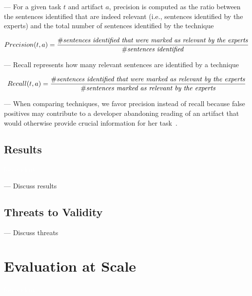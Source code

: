 --- For a given task $t$ and artifact $a$, precision is computed as the ratio between the sentences identified that are indeed relevant (i.e., sentences identified by the experts) and the total number of sentences identified by the technique


\begin{equation}
    Precision(t, a) = \frac{\# \text{\textit{sentences identified that were marked as relevant by the experts}}}{\# \text{\textit{sentences identified}}}
\end{equation}

\vspace{3mm}

--- Recall represents how many relevant sentences are identified by a technique


\begin{equation}
    Recall(t, a) = \frac{\# \text{\textit{sentences identified that were marked as relevant by the experts}}}{\# \text{\textit{sentences marked as relevant by the experts}}}
\end{equation}

\vspace{3mm}

--- When comparing techniques, we favor precision instead of recall because false positives may contribute to a developer abandoning reading of an artifact that would otherwise provide crucial information for her task~\cite{Rastkar2010}.


\subsection{Results}
\textcolor{white}{force ident} %

--- Discuss results \vspace{3mm}

\subsection{Threats to Validity}

--- Discuss threats \vspace{3mm}

\clearpage


\section{Evaluation at Scale}
\textcolor{white}{force ident} %

